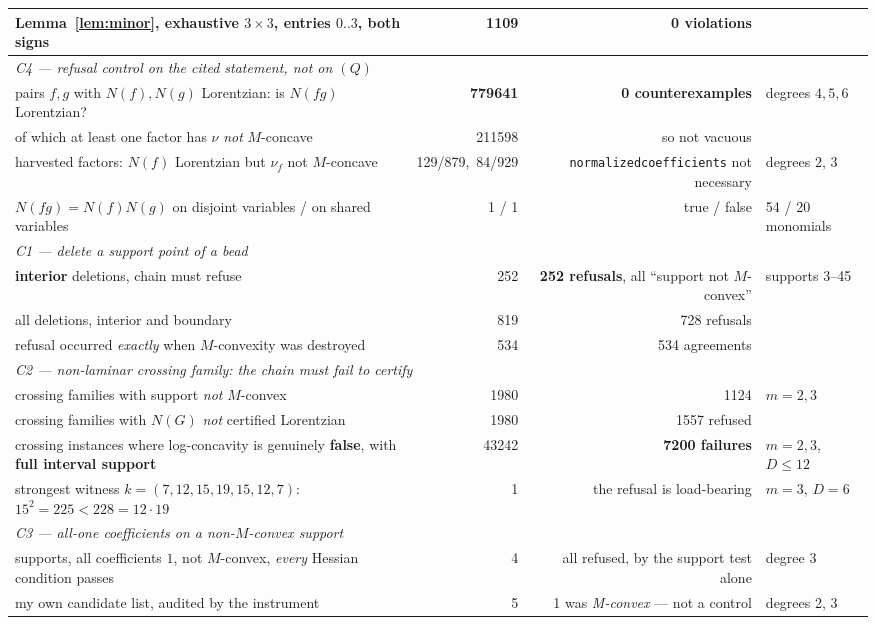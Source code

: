 \begin{table}[t]
\begin{center}
\begin{tabular}{p{}rrp{}}
Lemma~\ref{lem:minor}, exhaustive $3\times3$, entries $0..3$, both signs
  & 1109 & 0 violations & \\
\hline
\multicolumn{4}{l}{\emph{C4 --- refusal control on the cited statement, not on $(Q)$}}\\
pairs $f,g$ with $N(f),N(g)$ Lorentzian: is $N(fg)$ Lorentzian?
  & \textbf{779641} & \textbf{0 counterexamples} & degrees $4,5,6$\\
\quad of which at least one factor has $\nu$ \emph{not} $M$-concave
  & 211598 & so not vacuous & \\
harvested factors: $N(f)$ Lorentzian but $\nu_f$ not $M$-concave
  & 129/879,\ 84/929 & \texttt{normalizedcoefficients} not necessary & degrees $2$, $3$\\
$N(fg)=N(f)N(g)$ on disjoint variables / on shared variables
  & 1 / 1 & true / false & 54 / 20 monomials\\
\hline
\multicolumn{4}{l}{\emph{C1 --- delete a support point of a bead}}\\
\textbf{interior} deletions, chain must refuse
  & 252 & \textbf{252 refusals}, all ``support not $M$-convex'' & supports 3--45\\
all deletions, interior and boundary
  & 819 & 728 refusals & \\
refusal occurred \emph{exactly} when $M$-convexity was destroyed
  & 534 & 534 agreements & \\
\hline
\multicolumn{4}{l}{\emph{C2 --- non-laminar crossing family: the chain must fail to certify}}\\
crossing families with support \emph{not} $M$-convex
  & 1980 & 1124 & $m=2,3$\\
crossing families with $N(G)$ \emph{not} certified Lorentzian
  & 1980 & 1557 refused & \\
crossing instances where log-concavity is genuinely \textbf{false},
  with \textbf{full interval support}
  & 43242 & \textbf{7200 failures} & $m=2,3$, $D\le12$\\
\quad strongest witness $k=(7,12,15,19,15,12,7)$: $15^2=225<228=12\cdot19$
  & 1 & the refusal is load-bearing & $m=3$, $D=6$\\
\hline
\multicolumn{4}{l}{\emph{C3 --- all-one coefficients on a non-$M$-convex support}}\\
supports, all coefficients $1$, not $M$-convex, \emph{every} Hessian condition passes
  & 4 & all refused, by the support test alone & degree 3\\
my own candidate list, audited by the instrument
  & 5 & 1 was \emph{M-convex} --- not a control & degrees 2, 3\\

\end{tabular}
\end{center}
\end{table}

